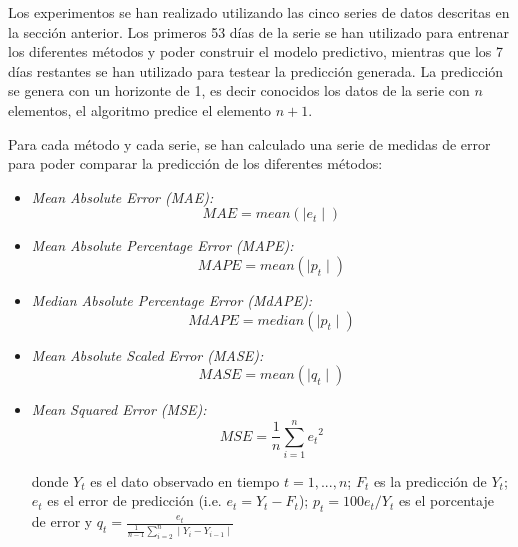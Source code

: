 \documentclass[runningheads]{llncs}
\begin{document}
Los experimentos se han realizado utilizando las cinco series de datos descritas en la sección
anterior. Los primeros 53 días de la serie se han utilizado para entrenar los diferentes métodos y
poder construir el modelo predictivo, mientras que los 7 días restantes se han utilizado para
testear la predicción generada. La predicción se genera con un horizonte de 1, es decir conocidos
los datos de la serie con $n$ elementos, el algoritmo predice el elemento $n+1$. 

Para cada método y cada serie, se han calculado una serie de medidas de error para poder
comparar la predicción de los diferentes métodos:
\begin{itemize}
  \item \it{Mean Absolute Error} (MAE):
        \begin{equation}\label{eq:MAE}
            MAE = mean(\mid e_t\mid)
        \end{equation}

  \item \it{Mean Absolute Percentage Error} (MAPE):
        \begin{equation}\label{eq:MAPE}
            MAPE = mean(\mid p_t\mid)
        \end{equation}

        \bigskip
  \item \it{Median Absolute Percentage Error} (MdAPE):
        \begin{equation}\label{eq:MDAPE}
            MdAPE = median(\mid p_t\mid)
        \end{equation}

  \item \it{Mean Absolute Scaled Error} (MASE):
        \begin{equation}\label{eq:MASE}
            MASE = mean(\mid q_t\mid)
        \end{equation}

  \item \it{Mean Squared Error} (MSE):
        \begin{equation}\label{eq:MSE}
            MSE = \frac{1}{n}\sum_{i=1}^n {e_t}^2
        \end{equation}


donde  $Y_t$ es el dato observado en tiempo $t = {1,...,n}$; $F_t$ es la predicción de  $Y_t$; $e_t$
es el error de predicción (i.e. $e_t= Y_t - F_t$); $p_t = 100e_t/Y_t$ es el porcentaje de error y 
         $q_t = \displaystyle\frac{e_t}{\displaystyle\frac{1}{n-1} \sum_{i=2}^n \mid Y_i - Y_{i-1} \mid }$
\end{itemize}
\end{document}
